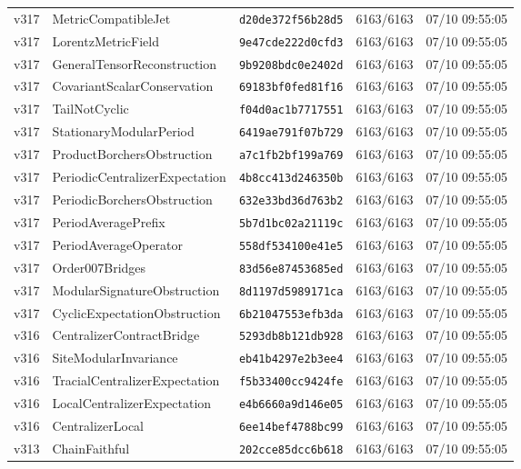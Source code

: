 \documentclass[11pt]{article}
\theoremstyle{definition}\newtheorem{deriv}{Derivação}
\begin{document}
{\begin{longtable}{@{}lllll@{}}
v317 & MetricCompatibleJet & \texttt{d20de372f56b28d5} & 6163/6163 & 07/10 09:55:05 \\
v317 & LorentzMetricField & \texttt{9e47cde222d0cfd3} & 6163/6163 & 07/10 09:55:05 \\
v317 & GeneralTensorReconstruction & \texttt{9b9208bdc0e2402d} & 6163/6163 & 07/10 09:55:05 \\
v317 & CovariantScalarConservation & \texttt{69183bf0fed81f16} & 6163/6163 & 07/10 09:55:05 \\
v317 & TailNotCyclic & \texttt{f04d0ac1b7717551} & 6163/6163 & 07/10 09:55:05 \\
v317 & StationaryModularPeriod & \texttt{6419ae791f07b729} & 6163/6163 & 07/10 09:55:05 \\
v317 & ProductBorchersObstruction & \texttt{a7c1fb2bf199a769} & 6163/6163 & 07/10 09:55:05 \\
v317 & PeriodicCentralizerExpectation & \texttt{4b8cc413d246350b} & 6163/6163 & 07/10 09:55:05 \\
v317 & PeriodicBorchersObstruction & \texttt{632e33bd36d763b2} & 6163/6163 & 07/10 09:55:05 \\
v317 & PeriodAveragePrefix & \texttt{5b7d1bc02a21119c} & 6163/6163 & 07/10 09:55:05 \\
v317 & PeriodAverageOperator & \texttt{558df534100e41e5} & 6163/6163 & 07/10 09:55:05 \\
v317 & Order007Bridges & \texttt{83d56e87453685ed} & 6163/6163 & 07/10 09:55:05 \\
v317 & ModularSignatureObstruction & \texttt{8d1197d5989171ca} & 6163/6163 & 07/10 09:55:05 \\
v317 & CyclicExpectationObstruction & \texttt{6b21047553efb3da} & 6163/6163 & 07/10 09:55:05 \\
v316 & CentralizerContractBridge & \texttt{5293db8b121db928} & 6163/6163 & 07/10 09:55:05 \\
v316 & SiteModularInvariance & \texttt{eb41b4297e2b3ee4} & 6163/6163 & 07/10 09:55:05 \\
v316 & TracialCentralizerExpectation & \texttt{f5b33400cc9424fe} & 6163/6163 & 07/10 09:55:05 \\
v316 & LocalCentralizerExpectation & \texttt{e4b6660a9d146e05} & 6163/6163 & 07/10 09:55:05 \\
v316 & CentralizerLocal & \texttt{6ee14bef4788bc99} & 6163/6163 & 07/10 09:55:05 \\
v313 & ChainFaithful & \texttt{202cce85dcc6b618} & 6163/6163 & 07/10 09:55:05 \\

\end{longtable}}
\end{document}
